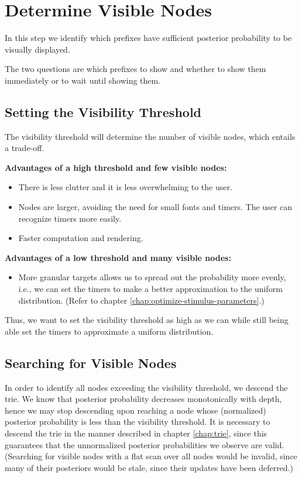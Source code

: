 \chapter{Determine Visible Nodes}
\label{chap:determine-visible-nodes}

In this step we identify which prefixes have sufficient
posterior probability to be visually displayed.

The two questions are which prefixes to show and whether
to show them immediately or to wait until showing them.

\section{Setting the Visibility Threshold}

The visibility threshold will determine the number
of visible nodes, which entails a trade-off.


\medskip\noindent\textbf{Advantages of a high threshold and few visible nodes:}
\begin{itemize}[topsep=2pt]
  \item There is less clutter and it is less overwhelming to the user.
  \item Nodes are larger, avoiding the need for small fonts and timers. The user can recognize timers more easily.
  \item Faster computation and rendering.
\end{itemize}


\medskip\noindent\textbf{Advantages of a low threshold and many visible nodes:}
\begin{itemize}[topsep=2pt]
  \item More granular targets allows us to spread out the probability
  more evenly, i.e., we can set the timers to make a better approximation to the uniform distribution.
  (Refer to chapter \ref{chap:optimize-stimulus-parameters}.)
\end{itemize}

Thus, we want to set the visibility threshold as high as we can while still
being able set the timers to approximate a uniform distribution.

\section{Searching for Visible Nodes}
In order to identify all nodes exceeding the visibility threshold, we descend the trie.
We know that posterior probability decreases monotonically with depth, hence we may
stop descending upon reaching a node whose (normalized) posterior probability is less than the visibility threshold.
It is necessary to descend the trie in the manner described in chapter \ref{chap:trie}, 
since this guarantees that the unnormalized posterior probabilities we observe are valid.
(Searching for visible nodes with a flat scan over all nodes would be invalid,
since many of their posteriors would be stale, since their updates have been deferred.)

